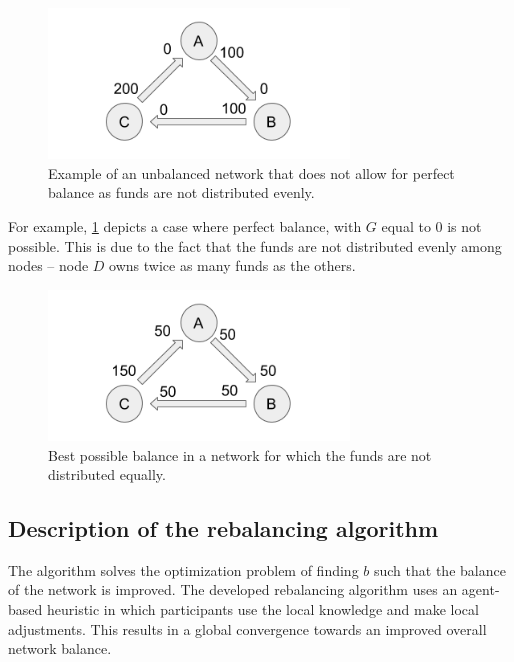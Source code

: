 \documentclass[a4paper]{paper}
\begin{document}
\begin{figure}
 \centering
 \includegraphics[width=8cm]{img/oddUnbalanced.png}
 \caption{Example of an unbalanced network that does not allow for perfect balance as funds are not distributed evenly.}
 \label{fig:oddUnbalanced}
\end{figure}

For example, \cref{fig:oddUnbalanced} depicts a case where perfect balance, with $G$ equal to $0$  is not possible. 
This is due to the fact that the funds are not distributed evenly among nodes -- node $D$ owns twice as many funds as the others.

\begin{figure}
 \centering
 \includegraphics[width=8cm]{img/oddBalanced.png}
 \caption{Best possible balance in a network for which the funds are not distributed equally.}
 \label{fig:oddBalanced}
\end{figure}



\subsection{Description of the rebalancing algorithm}
\label{sec:Algorithm}

The algorithm solves the optimization problem of finding $b$ such that the balance of the network is improved.
The developed rebalancing algorithm uses an agent-based heuristic in which participants use the local knowledge and make local adjustments. 
This results in a global convergence towards an improved overall network balance. 
\end{document}
